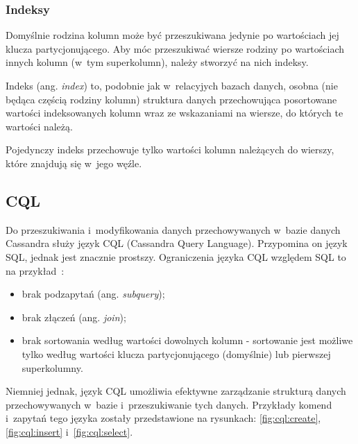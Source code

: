 \subsubsection{Indeksy}

Domyślnie rodzina kolumn może być przeszukiwana jedynie po wartościach jej klucza partycjonującego.
Aby móc przeszukiwać wiersze rodziny po wartościach innych kolumn (w~tym superkolumn), należy stworzyć na nich indeksy.

Indeks (ang. \emph{index}) to, podobnie jak w~relacyjych bazach danych, osobna (nie będąca częścią rodziny kolumn) struktura danych przechowująca posortowane wartości indeksowanych kolumn wraz ze wskazaniami na wiersze, do których te wartości należą.

Pojedynczy indeks przechowuje tylko wartości kolumn należących do wierszy, które znajdują się w~jego węźle.


\subsection{CQL}

Do przeszukiwania i~modyfikowania danych przechowywanych w~bazie danych Cassandra służy język CQL (Cassandra Query Language).
Przypomina on język SQL, jednak jest znacznie prostszy.
Ograniczenia języka CQL względem SQL to na przykład~\cite{cassandra_3_0}:

\begin{itemize}
 \item brak podzapytań (ang. \emph{subquery});
 \item brak złączeń (ang. \emph{join});
 \item brak sortowania według wartości dowolnych kolumn - sortowanie jest możliwe tylko według wartości klucza partycjonującego (domyślnie) lub pierwszej superkolumny.
\end{itemize}

Niemniej jednak, język CQL umożliwia efektywne zarządzanie strukturą danych przechowywanych w~bazie i~przeszukiwanie tych danych.
Przykłady komend i~zapytań tego języka zostały przedstawione na rysunkach: \ref{fig:cql:create}, \ref{fig:cql:insert} i~\ref{fig:cql:select}.






